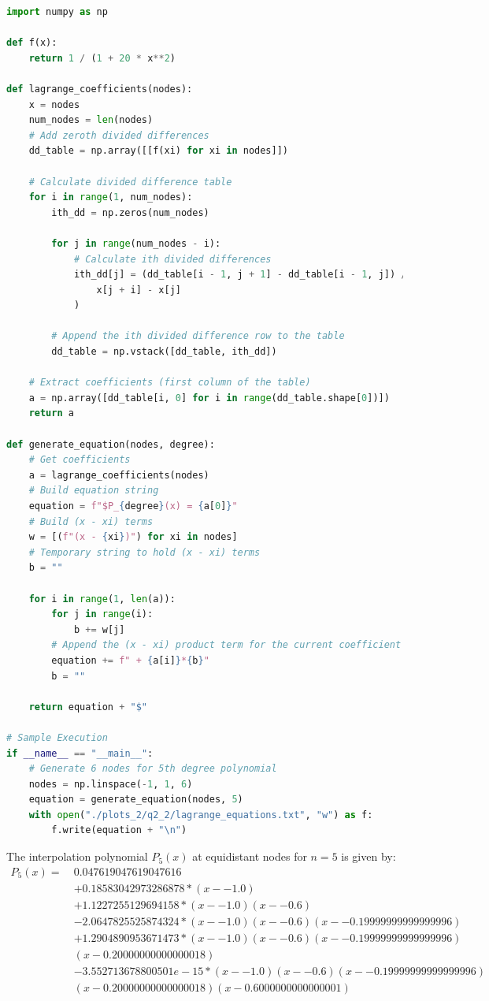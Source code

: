\documentclass[12pt]{article}
\begin{document}
\begin{lstlisting}[language=Python, caption=2.1 Python]
import numpy as np

def f(x):
    return 1 / (1 + 20 * x**2)

def lagrange_coefficients(nodes):
    x = nodes
    num_nodes = len(nodes)
    # Add zeroth divided differences
    dd_table = np.array([[f(xi) for xi in nodes]])

    # Calculate divided difference table
    for i in range(1, num_nodes):
        ith_dd = np.zeros(num_nodes)

        for j in range(num_nodes - i):
            # Calculate ith divided differences
            ith_dd[j] = (dd_table[i - 1, j + 1] - dd_table[i - 1, j]) / (
                x[j + i] - x[j]
            )

        # Append the ith divided difference row to the table
        dd_table = np.vstack([dd_table, ith_dd])

    # Extract coefficients (first column of the table)
    a = np.array([dd_table[i, 0] for i in range(dd_table.shape[0])])
    return a

def generate_equation(nodes, degree):
    # Get coefficients
    a = lagrange_coefficients(nodes)
    # Build equation string
    equation = f"$P_{degree}(x) = {a[0]}"
    # Build (x - xi) terms
    w = [(f"(x - {xi})") for xi in nodes]
    # Temporary string to hold (x - xi) terms
    b = ""

    for i in range(1, len(a)):
        for j in range(i):
            b += w[j]
        # Append the (x - xi) product term for the current coefficient
        equation += f" + {a[i]}*{b}"
        b = ""

    return equation + "$"

# Sample Execution
if __name__ == "__main__":
    # Generate 6 nodes for 5th degree polynomial
    nodes = np.linspace(-1, 1, 6)
    equation = generate_equation(nodes, 5)
    with open("./plots_2/q2_2/lagrange_equations.txt", "w") as f:
        f.write(equation + "\n")

\end{lstlisting}

The interpolation polynomial $P_5(x)$ at equidistant nodes for $n=5$ is given by:
\begin{align*}
    P_5(x) =\ & 0.047619047619047616 \\
    &+ 0.18583042973286878*(x - -1.0) \\
    &+ 1.1227255129694158*(x - -1.0)(x - -0.6) \\
    &- 2.0647825525874324*(x - -1.0)(x - -0.6)(x - -0.19999999999999996) \\
    &+ 1.2904890953671473*(x - -1.0)(x - -0.6)(x - -0.19999999999999996)\\
    &(x - 0.20000000000000018) \\
    &- 3.552713678800501e-15*(x - -1.0)(x - -0.6)(x - -0.19999999999999996)\\
    &(x - 0.20000000000000018)(x - 0.6000000000000001)
\end{align*}
\end{document}
